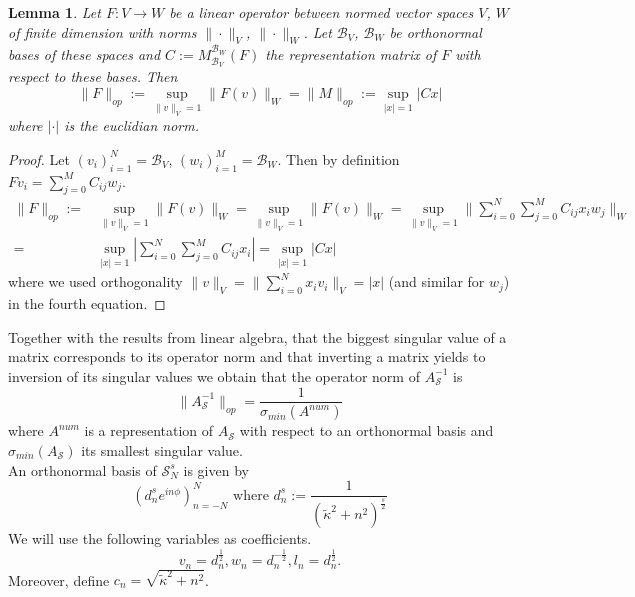 \documentclass[12pt,journal,compsoc, onecolumn]{IEEEtran}
\newtheorem{lemma}[theorem]{Lemma}
\begin{document}
\begin{lemma}
    Let $F: V \rightarrow W$ be a linear operator between normed vector spaces $V$, $W$ of finite dimension with norms $\| \cdot \|_V$, $\| \cdot \|_W$. Let $\mathcal{B}_V$, $\mathcal{B}_W$ be orthonormal bases of these spaces and $C := M_{\mathcal{B}_V}^{\mathcal{B}_W}(F)$ the representation matrix of $F$ with respect to these bases. Then $$\|F\|_{op} := \sup\limits_{\|v\|_{V}=1}\|F(v)\|_{W} = \|M\|_{op} :=  \sup\limits_{|x|=1}|Cx|$$ where $|\cdot|$ is the euclidian norm.
\end{lemma}
\begin{proof}
    Let $(v_i)_{i=1}^N = \mathcal{B}_V$, $(w_i)_{i=1}^M=\mathcal{B}_W$. Then by definition $F v_i = \sum\limits_{j=0}^M C_{ij} w_j$.
    \begin{align}
        \|F\|_{op} := &\sup\limits_{\|v\|_{V}=1}\|F(v)\|_{W} = \sup\limits_{\|v\|_{V}=1}\|F(v)\|_{W} = \sup\limits_{\|v\|_{V}=1}\|\sum\limits_{i = 0}^N\sum\limits_{j = 0}^M C_{ij} x_i w_j\|_{W} \nonumber\\
        =& \sup\limits_{|x|=1}|\sum\limits_{i = 0}^N\sum\limits_{j = 0}^M C_{ij} x_i | = \sup\limits_{|x|=1}|Cx|
    \end{align}
    where we used orthogonality $\|v\|_{V} = \|\sum\limits_{i=0}^N x_i v_i\|_{V} = | x|$ (and similar for $w_j$) in the fourth equation. 
\end{proof}  \noindent
Together with the results from linear algebra, that the biggest singular value of a matrix corresponds to its operator norm and that inverting a matrix yields to inversion of its singular values we obtain that the operator norm of $A_{\mathcal{S}}^{-1}$ is $$\|A_{\mathcal{S}}^{-1}\|_{op} = \frac{1}{\sigma_{min}(A^{num})}$$ where $A^{num}$ is a representation of $A_{\mathcal{S}}$ with respect to an orthonormal basis and  $\sigma_{min}(A_{\mathcal{S}})$ its smallest singular value. \\
An orthonormal basis of $\mathcal{S}^s_N$ is given by 
\begin{equation}
    \label{eq:basis}
    \left(d_n^se^{in\phi}\right)_{n = - N}^N \text{ where } d_n^s := \frac{1}{(\tilde\kappa^2 + n^2)^{\frac{s}{2}}}
\end{equation}
    We will use the following variables as coefficients.
\begin{equation}
    v_{n} = d_n^{\frac{1}{2}}, w_{n} = d_n^{-\frac{1}{2}}, l_n = d_n^{\frac{1}{2}}.
\end{equation}
Moreover, define $c_n = \sqrt{\tilde \kappa^2 + n^2}$.\\
\end{document}
